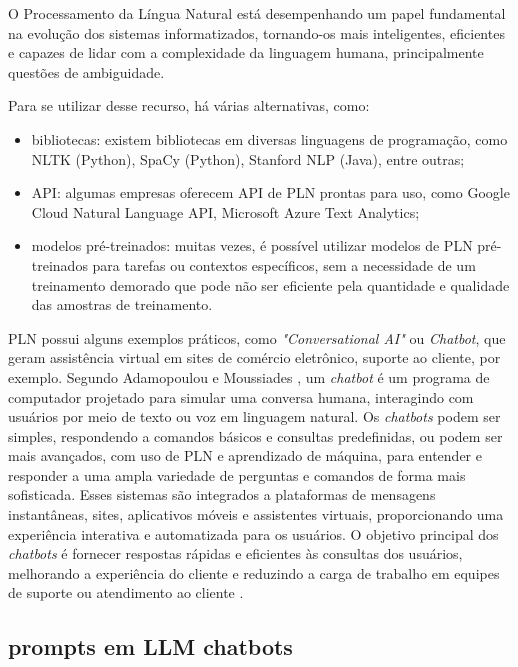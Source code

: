 \documentclass[10pt, conference, compsocconf]{IEEEtran}
\begin{document}
O Processamento da Língua Natural está desempenhando um papel fundamental na evolução dos sistemas informatizados, tornando-os mais inteligentes, eficientes e capazes de lidar com a complexidade da linguagem humana, principalmente questões de ambiguidade. 

Para se utilizar desse recurso, há várias alternativas, como:

\begin{itemize}
    \item bibliotecas: existem  bibliotecas em diversas linguagens de programação, como NLTK (Python), SpaCy (Python), Stanford NLP (Java), entre outras;
    \item API: algumas empresas oferecem API de PLN prontas para uso, como Google Cloud Natural Language API, Microsoft Azure Text Analytics;
    \item modelos pré-treinados: muitas vezes, é possível utilizar modelos de PLN pré-treinados para tarefas ou contextos específicos, sem a necessidade de um treinamento demorado que pode não ser eficiente pela quantidade e qualidade das amostras de treinamento.
\end{itemize}

PLN possui alguns exemplos práticos, como \textit{"Conversational AI"} ou \textit{Chatbot}, que geram assistência virtual em sites de comércio eletrônico, suporte ao cliente, por exemplo. Segundo Adamopoulou e Moussiades \cite{adamopoulou2020overview}, um \textit{chatbot} é um programa de computador projetado para simular uma conversa humana, interagindo com usuários por meio de texto ou voz em linguagem natural.  Os \textit{chatbots} podem ser simples, respondendo a comandos básicos e consultas predefinidas, ou podem ser mais avançados, com uso de PLN e aprendizado de máquina, para entender e responder a uma ampla variedade de perguntas e comandos de forma mais sofisticada. Esses sistemas  são integrados a plataformas de mensagens instantâneas, sites, aplicativos móveis e assistentes virtuais, proporcionando uma experiência interativa e automatizada para os usuários. O objetivo principal dos \textit{chatbots} é fornecer respostas rápidas e eficientes às consultas dos usuários, melhorando a experiência do cliente e reduzindo a carga de trabalho em equipes de suporte ou atendimento ao cliente \cite{PKenny2011}.

\subsection{prompts em LLM chatbots}
\end{document}
